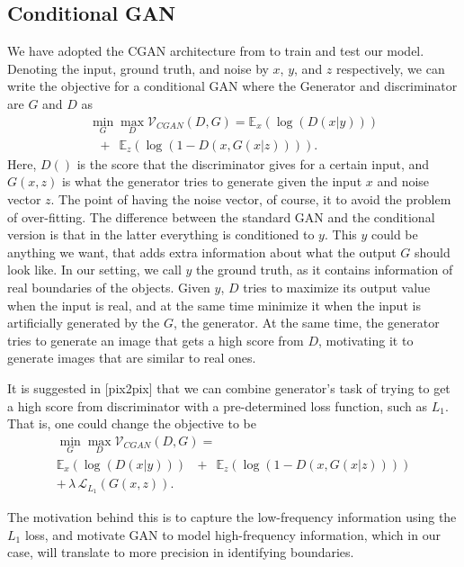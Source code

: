 \subsection{Conditional GAN} \label{cGAN}
We have adopted the CGAN architecture from \cite{pix2pix} to train and test our model. Denoting the input, ground truth, and noise by $x$, $y$, and $z$ respectively, we can write the objective for a conditional GAN where the Generator and discriminator are $G$ and $D$ as
\begin{equation}
\begin{array}{l}
\min_G \max_D \mathcal{V}_{CGAN}(D,G) = \mathbb{E}_{x}(\log(D(x|y)))\\
\, \, \, \,+ \, \, \, \mathbb{E}_{z}(\log(1-D(x,G(x|z)))).
\end{array}
\end{equation}
Here, $D()$ is the score that the discriminator gives for a certain input, and $G(x,z)$ is what the generator tries to generate given the input $x$ and noise vector $z$. The point of having the noise vector, of course, it to avoid the problem of over-fitting. The difference between the standard GAN and the conditional version is that in the latter everything is conditioned to $y$. This $y$ could be anything we want, that adds extra information about what the output $G$ should look like. In our setting, we call $y$ the ground truth, as it contains information of real boundaries of the objects. Given $y$, $D$ tries to maximize its output value when the input is real, and at the same time minimize it when the input is artificially generated by the $G$, the generator. At the same time, the generator tries to generate an image that gets a high score from $D$, motivating it to generate images that are similar to real ones.

It is suggested in [pix2pix] that we can combine generator's task of trying to get a high score from discriminator with a pre-determined loss function, such as $L_1$. That is, one could change the objective to be
\begin{equation}
\begin{array}{l}
\min_G \max_D \mathcal{V}_{CGAN}(D,G) =\\
\mathbb{E}_{x}(\log(D(x|y))) \, \, \, \,+ \, \, \, \mathbb{E}_{z}(\log(1-D(x,G(x|z))))\\
+\,\lambda \, \mathcal{L}_{L_1}(G(x,z)).
\end{array}
\end{equation}

The motivation behind this is to capture the low-frequency information using the $L_1$ loss, and motivate GAN to model high-frequency information, which in our case, will translate to more precision in identifying boundaries.

